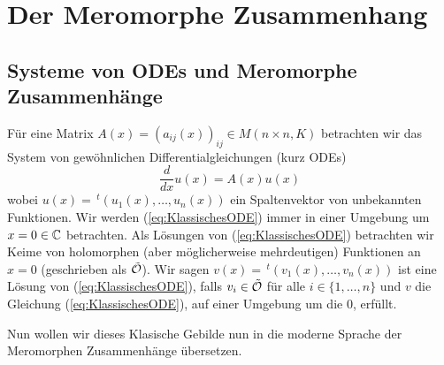\begin{comment}
Alle MeromZsh sind $\cD$-Moduln aber nicht andersherum?
\end{comment}

\chapter{Der Meromorphe Zusammenhang}
\section{Systeme von ODEs und Meromorphe Zusammenhänge}
\cite[Chap 5.1.1]{hotta2007d} %
Für eine Matrix $A(x)=(a_{ij}(x))_{ij}\in M(n\times n,K)$ betrachten wir das
System von gewöhnlichen Differentialgleichungen (kurz ODEs)
\begin{equation}
\label{eq:KlassischesODE}
\frac{d}{dx}u(x)=A(x)u(x)
\end{equation}
wobei $u(x)=\,^t(u_1(x),\dots,u_n(x))$ ein Spaltenvektor von unbekannten
Funktionen. Wir werden (\ref{eq:KlassischesODE}) immer in einer Umgebung um
$x=0\in\mathbb{C}$ betrachten. Als Lösungen von (\ref{eq:KlassischesODE}) betrachten
wir Keime von holomorphen (aber möglicherweise mehrdeutigen)
Funktionen an $x=0$ (geschrieben als $\tilde{\mathcal{O}}$).
 Wir sagen $v(x)=\,^t(v_1(x),\dots,v_n(x))$ ist
eine Lösung von (\ref{eq:KlassischesODE}), falls $ v_i\in\tilde {\mathcal{O}}$ für alle
$i\in\{1,\dots,n\}$ und $v$ die Gleichung (\ref{eq:KlassischesODE}),
auf einer Umgebung um die $0$, erfüllt.

Nun wollen wir dieses Klasische Gebilde nun in die moderne Sprache der
Meromorphen Zusammenhänge übersetzen.

